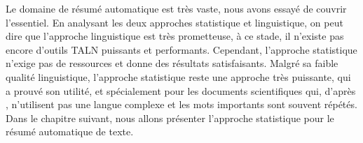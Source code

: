 \documentclass[a4paper,12pt,oneside]{../use/ESIthesis}
\begin{document}
Le domaine de résumé automatique est très vaste, nous avons essayé de couvrir l'essentiel. 
En analysant les deux approches statistique et linguistique, on peut dire que l'approche linguistique est très prometteuse, à ce stade, il n'existe pas encore d'outils TALN puissants et performants. 
Cependant, l'approche statistique n'exige pas de ressources et donne des résultats satisfaisants. 
Malgré sa faible qualité linguistique, l'approche statistique reste une approche très puissante, qui a prouvé son utilité, et spécialement pour les documents scientifiques qui, d'après \cite{58-luhn}, n'utilisent pas une langue complexe et les mots importants sont souvent répétés. 
Dans le chapitre suivant, nous allons présenter l'approche statistique pour le résumé automatique de texte. 

\ifx\wholebook\relax\else
 \clearpage
 \let\wholebook=\relax
 \appendix
 
 
 
\end{document}
